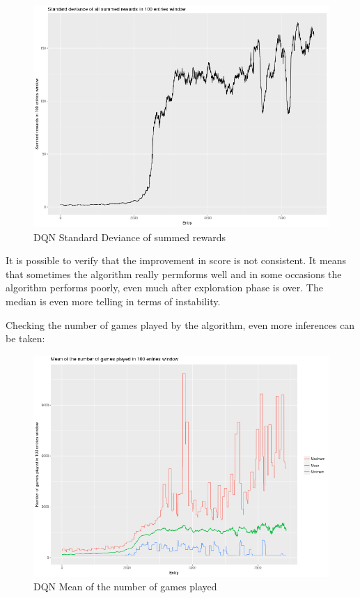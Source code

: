 \documentclass[11pt,twoside,a4paper]{article}
\begin{document}
\begin{figure}[H]
  \includegraphics[scale=0.35]{log-analysis/dqn-sd-summed-rewards.png}
  \centering
  \caption{DQN Standard Deviance of summed rewards}
  \label{fig:dqn-sd-summed-rewards}
\end{figure}

It is possible to verify that the improvement in score is not consistent. It
means that sometimes the algorithm really permforms well and in some occasions
the algorithm performs poorly, even much after exploration phase is over. The
median is even more telling in terms of instability.

Checking the number of games played by the algorithm, even more inferences can
be taken:

\begin{figure}[H]
  \includegraphics[scale=0.35]{log-analysis/dqn-mean-ngp.png}
  \centering
  \caption{DQN Mean of the number of games played}
  \label{fig:dqn-mean-ngp}
\end{figure}
\end{document}
